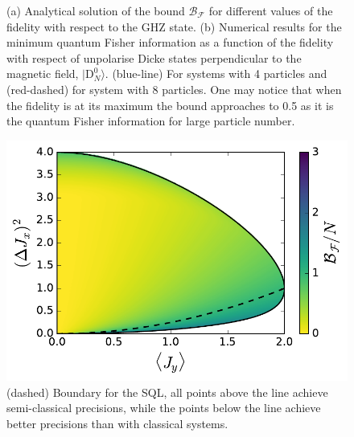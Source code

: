 \begin{figure}
  \centering
  \caption{(a) Analytical solution of the bound $\mathcal{B}_{\mathcal{F}}$ for different values of the fidelity with respect to the GHZ state. (b) Numerical results for the minimum quantum Fisher information as a function of the fidelity with respect of unpolarise Dicke states perpendicular to the magnetic field, $|\text{D}_N^0\rangle$. (blue-line) For systems with 4 particles and (red-dashed) for system with 8 particles. One may notice that when the fidelity is at its maximum the bound approaches to 0.5 as it is the quantum Fisher information for large particle number.}
  \label{fig:vd-secuence-evo}
\end{figure}

\begin{figure}
  \centering
  \includegraphics[scale=.65]{img/plots/LT_spsq2d_4.pdf}
  \caption{(dashed) Boundary for the SQL, all points above the line achieve semi-classical precisions, while the points below the line achieve better precisions than with classical systems.}
  \label{fig:vd-secuence-evo}
\end{figure}

